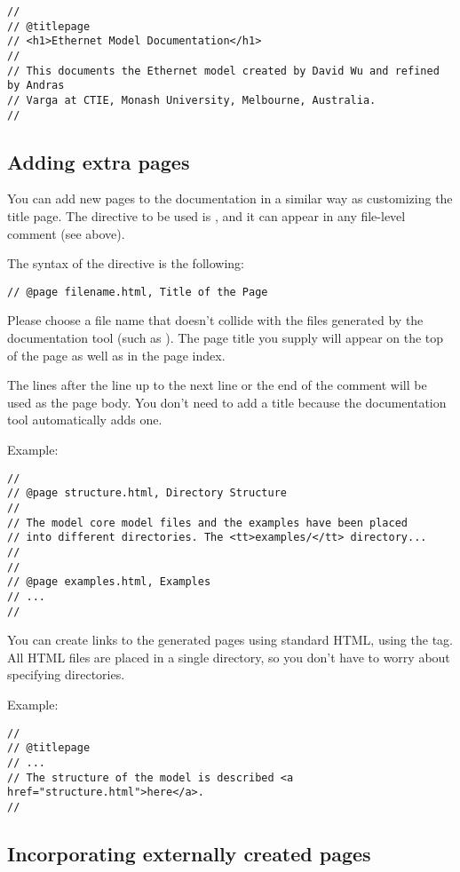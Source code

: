 \begin{verbatim}
//
// @titlepage
// <h1>Ethernet Model Documentation</h1>
//
// This documents the Ethernet model created by David Wu and refined by Andras
// Varga at CTIE, Monash University, Melbourne, Australia.
//
\end{verbatim}


\subsection{Adding extra pages}

You can add new pages to the documentation in a similar way as customizing
the title page. The directive to be used is , and it can
appear in any file-level comment (see above).

The syntax of the  directive is the following:

\begin{verbatim}
// @page filename.html, Title of the Page
\end{verbatim}

Please choose a file name that doesn't collide with the files generated
by the documentation tool (such as ).
The page title you supply will appear on the top of the page as well as
in the page index.

The lines after the  line up to the next  line
or the end of the comment will be used as the page body.
You don't need to add a title because the documentation tool
automatically adds one.

Example:
\begin{verbatim}
//
// @page structure.html, Directory Structure
//
// The model core model files and the examples have been placed
// into different directories. The <tt>examples/</tt> directory...
//
//
// @page examples.html, Examples
// ...
//
\end{verbatim}

You can create links to the generated pages using standard HTML,
using the  tag. All HTML files are
placed in a single directory, so you don't have to worry about
specifying directories.

Example:
\begin{verbatim}
//
// @titlepage
// ...
// The structure of the model is described <a href="structure.html">here</a>.
//
\end{verbatim}


\subsection{Incorporating externally created pages}

